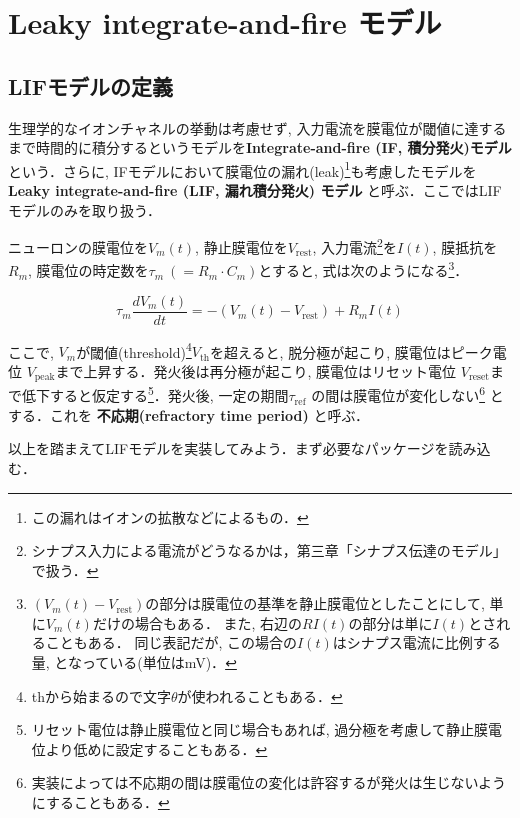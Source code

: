 \section{Leaky integrate-and-fire モデル}
\subsection{LIFモデルの定義}
生理学的なイオンチャネルの挙動は考慮せず, 入力電流を膜電位が閾値に達するまで時間的に積分するというモデルを\textbf{Integrate-and-fire (IF, 積分発火)モデル} という．さらに, IFモデルにおいて膜電位の漏れ(leak)\footnote{この漏れはイオンの拡散などによるもの． }も考慮したモデルを \textbf{Leaky integrate-and-fire (LIF, 漏れ積分発火) モデル} と呼ぶ．ここではLIFモデルのみを取り扱う．

ニューロンの膜電位を$V_m(t)$, 静止膜電位を$V_\text{rest}$, 入力電流\footnote{シナプス入力による電流がどうなるかは，第三章「シナプス伝達のモデル」で扱う．}を$I(t)$, 膜抵抗を$R_m$, 膜電位の時定数を$\tau_m\ (=R_m \cdot C_m)$とすると, 式は次のようになる\footnote{$(V_{m}(t)-V_\text{rest})$の部分は膜電位の基準を静止膜電位としたことにして, 単に$V_m(t)$だけの場合もある． また, 右辺の$RI(t)$の部分は単に$I(t)$とされることもある． 同じ表記だが, この場合の$I(t)$はシナプス電流に比例する量, となっている(単位はmV)． }．

\begin{equation}
\tau_m \frac{dV_{m}(t)}{dt}=-(V_{m}(t)-V_\text{rest})+R_mI(t)
\end{equation}

ここで, $V_m$が閾値(threshold)\footnote{thから始まるので文字$\theta$が使われることもある．}$V_{\text{th}}$を超えると, 脱分極が起こり, 膜電位はピーク電位 $V_{\text{peak}}$まで上昇する．発火後は再分極が起こり, 膜電位はリセット電位 $V_{\text{reset}}$まで低下すると仮定する\footnote{リセット電位は静止膜電位と同じ場合もあれば, 過分極を考慮して静止膜電位より低めに設定することもある．}．発火後, 一定の期間$\tau_{\text{ref}}$ の間は膜電位が変化しない\footnote{実装によっては不応期の間は膜電位の変化は許容するが発火は生じないようにすることもある．} とする．これを \textbf{不応期(refractory time period)} と呼ぶ．

以上を踏まえてLIFモデルを実装してみよう．まず必要なパッケージを読み込む．
